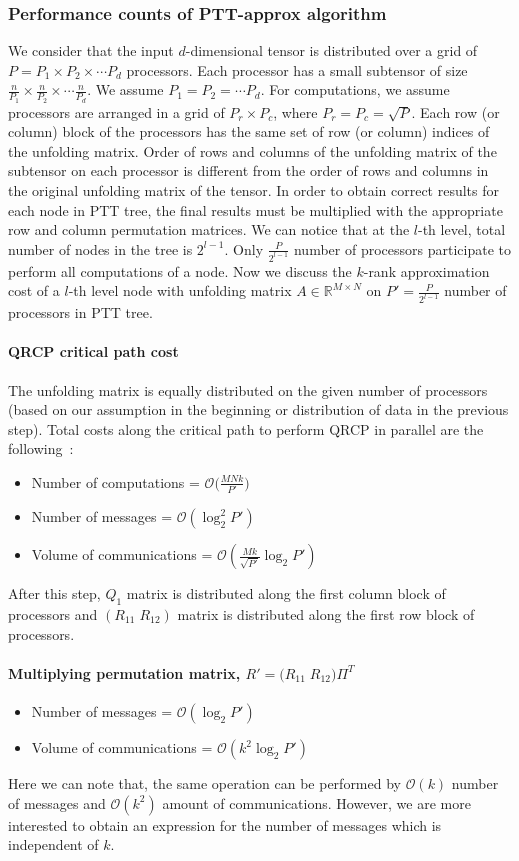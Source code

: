 \documentclass[sigconf]{acmart}
\begin{document}
\subsubsection{Performance counts of PTT-approx algorithm}
We consider that the input $d$-dimensional tensor is distributed over a grid of $P = P_1 \times P_2\times\cdots P_d$ processors. Each processor has a small subtensor of size $\frac{n}{P_1}\times \frac{n}{P_2} \times \cdots \frac{n}{P_d}$. We assume $P_1=P_2=\cdots P_d$. For computations, we assume processors are arranged in a grid of $P_r \times P_c$, where $P_r=P_c=\sqrt{P}$. Each row (or column) block of the processors has the same set of row (or column) indices of the unfolding matrix. Order of rows and columns of the unfolding matrix of the subtensor on each processor is different from the order of rows and columns in the original unfolding matrix of the tensor. In order to obtain correct results for each node in PTT tree, the final results must be multiplied with the appropriate row and column permutation matrices. We can notice that at the $l$-th level, total number of nodes in the tree is $2^{l-1}$. Only $\frac{P}{2^{l-1}}$ number of processors participate to perform all computations of a node. Now we discuss the $k$-rank approximation cost of a $l$-th level node with unfolding matrix $A\in \mathbb{R}^{M\times N}$ on $P' = \frac{P}{2^{l-1}}$ number of processors in PTT tree. 
\paragraph{QRCP critical path cost}
The unfolding matrix is equally distributed on the given number of processors (based on our assumption in the beginning or distribution of data in the previous step). Total costs along the critical path to perform QRCP in parallel are the following~\cite{beaupere-tournamentpivoting}:
\begin{itemize}
	\item Number of computations = $\mathcal{O}\big(\frac{MNk}{P'}\big)$
	\item Number of messages = $\mathcal{O}(\log_2^2 P')$
	\item Volume of communications = $\mathcal{O}(\frac{Mk}{\sqrt{P'}} \log_2 P' )$
\end{itemize}
After this step, $Q_1$ matrix is distributed along the first column block of processors and $(R_{11} \; R_{12})$ matrix is distributed along the first row block of processors.

\paragraph{Multiplying permutation matrix, $R' = \big(R_{11} \; R_{12}\big) \Pi^T$}
\begin{itemize}
	\item Number of messages = $\mathcal{O}(\log_2 P')$
	\item Volume of communications = $\mathcal{O}(k^2 \log_2 P')$
\end{itemize}
Here we can note that, the same operation can be performed by $\mathcal{O}(k)$ number of messages and $\mathcal{O}(k^2)$ amount of communications. However, we are more interested to obtain an expression for the number of messages which is independent of $k$.
\end{document}
